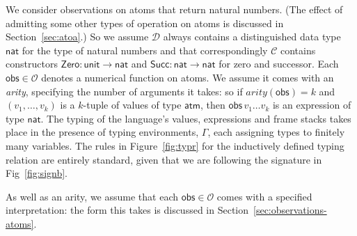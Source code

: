 \documentclass{LMCS}
\theoremstyle{plain}
\theoremstyle{definition}
\newcommand{\arity}{\mathit{arity}}
\newcommand{\ATM}{\kw{atm}}
\newcommand{\CON}[1][C]{\kw{#1}}
\newcommand{\Con}{\mathcal{C}}
\newcommand{\Dty}{\mathcal{D}}
\newcommand{\FUNTY}{\mathbin{\rightarrow}}
\newcommand{\kw}[1]{\mathsf{#1}}
\newcommand{\NAT}{\kw{nat}}
\newcommand{\Obs}{\mathcal{O}}
\newcommand{\OBS}[1][obs]{\kw{#1}}
\newcommand{\ofty}{:}
\newcommand{\UNIT}{\kw{unit}}
\newcommand{\val}[1][v]{#1}
\begin{document}
We consider observations on atoms that return natural numbers. (The
effect of admitting some other types of operation on atoms is
discussed in Section~\ref{sec:atoa}.) So we assume $\Dty$ always
contains a distinguished data type $\NAT$ for the type of natural
numbers and that correspondingly $\Con$ contains constructors
$\CON[Zero]\ofty\UNIT\FUNTY\NAT$ and $\CON[Succ]\ofty\NAT\FUNTY\NAT$
for zero and successor.  Each $\OBS\in\Obs$ denotes a numerical
function on atoms. We assume it comes with an \emph{arity}, specifying
the number of arguments it takes: so if $\arity(\OBS)=k$ and
$(\val_1,\ldots,\val_k)$ is a $k$-tuple of values of type $\ATM$, then
$\OBS\,\val_1\ldots\val_k$ is an expression of type $\NAT$. The typing
of the language's values, expressions and frame stacks takes place in
the presence of typing environments, $\Gamma$, each assigning types to
finitely many variables.  The rules in Figure~\ref{fig:typr} for the
inductively defined typing relation are entirely standard, given that
we are following the signature in Fig~\ref{fig:signb}.

As well as an arity, we assume that each $\OBS\in\Obs$ comes with a
specified interpretation: the form this takes is discussed in 
Section~\ref{sec:observations-atoms}.
\end{document}
